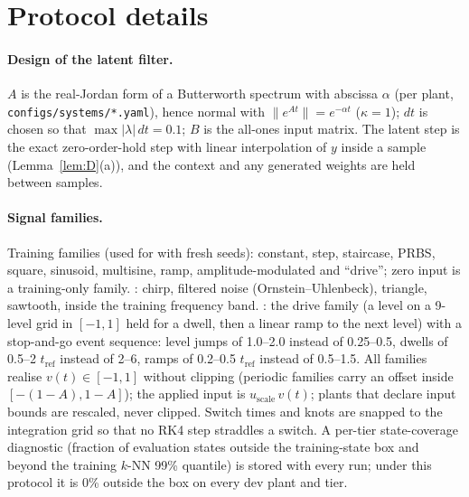 \section{Protocol details}\label{app:protocol}

\paragraph{Design of the latent filter.} $A$ is the real-Jordan form of a Butterworth spectrum with abscissa $\alpha$ (per plant, \texttt{configs/systems/*.yaml}), hence normal with $\|e^{At}\|=e^{-\alpha t}$ ($\kappa=1$); $dt$ is chosen so that $\max|\lambda|\,dt=0.1$; $B$ is the all-ones input matrix. The latent step is the exact zero-order-hold step with linear interpolation of $y$ inside a sample (Lemma~\ref{lem:D}(a)), and the context and any generated weights are held between samples.

\paragraph{Signal families.} Training families (used for  with fresh seeds): constant, step, staircase, PRBS, square, sinusoid, multisine, ramp, amplitude-modulated and ``drive''; zero input is a training-only family. : chirp, filtered noise (Ornstein--Uhlenbeck), triangle, sawtooth, inside the training frequency band. : the drive family (a level on a 9-level grid in $[-1,1]$ held for a dwell, then a linear ramp to the next level) with a stop-and-go event sequence: level jumps of 1.0--2.0 instead of 0.25--0.5, dwells of 0.5--2 $t_\mathrm{ref}$ instead of 2--6, ramps of 0.2--0.5 $t_\mathrm{ref}$ instead of 0.5--1.5. All families realise $v(t)\in[-1,1]$ without clipping (periodic families carry an offset inside $[-(1-A),1-A]$); the applied input is $u_\mathrm{scale}\,v(t)$; plants that declare input bounds are rescaled, never clipped. Switch times and knots are snapped to the integration grid so that no RK4 step straddles a switch. A per-tier state-coverage diagnostic (fraction of evaluation states outside the training-state box and beyond the training $k$-NN 99\% quantile) is stored with every run; under this protocol it is 0\% outside the box on every dev plant and tier.

